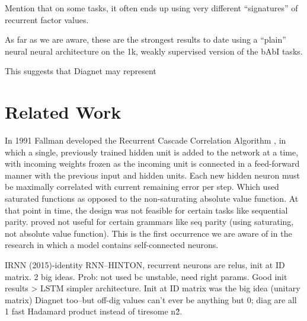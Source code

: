 \documentclass{article}
\begin{document}
Mention that on some tasks, it often ends up using very different “signatures” of recurrent factor values.

As far as we are aware, these are the strongest results to date using a “plain” neural neural architecture on the 1k, weakly supervised version of the bAbI tasks.

This suggests that Diagnet may represent 


\section{Related Work}
\label{gen_inst}





In 1991 Fallman developed the Recurrent Cascade Correlation Algorithm \citet{Fahlman1990TheRC}, in which a single, previously trained hidden unit is added to the network at a time, with incoming weights frozen as the incoming unit is connected in a feed-forward manner with the previous input and hidden units. Each new hidden neuron must be maximally correlated with current remaining error per step.  
Which used saturated functions as opposed to the non-saturating absolute value function.  At that point in time, the design was not feasible for certain tasks like sequential parity.  proved not useful for certain grammars like seq parity (using saturating, not absolute value function). This is the first occurrence we are aware of in the research in which a model contains self-connected neurons.

IRNN (2015)-identity RNN--HINTON, recurrent neurons are relus, init at ID matrix. 2 big ideas. Prob: not used bc unstable, need right params.  Good init results > LSTM simpler architecture. Init at ID matrix was the big idea (unitary matrix) Diagnet too--but off-dig values can't ever be anything but 0; diag are all 1 fast Hadamard product instead of tiresome n\^2. 
\end{document}
